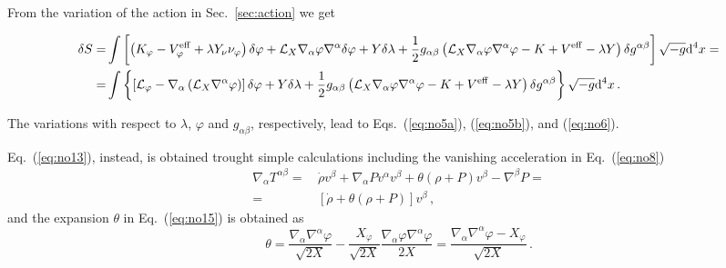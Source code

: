 \documentclass[twocolumn,showpacs, nofootinbib,aps,superscriptaddress, eqsecnum,prd,prl,notitlepage,showkeys,10pt,reprint]{revtex4-1}
\begin{document}
From the variation of the action in Sec.~\ref{sec:action} we get
%
\begin{widetext}
\begin{align}
\nonumber
\delta S = &\int \left[ \left(K_\varphi - V^{\rm eff}_\varphi + \lambda Y_\nu\nu_\varphi \right) \delta\varphi + \mathcal{L}_X \nabla_\alpha\varphi \nabla^\alpha \delta \varphi + Y \delta\lambda + \frac{1}{2} g_{\alpha\beta} \left(\mathcal{L}_X \nabla_\alpha\varphi \nabla^\alpha \varphi - K + V^{\rm eff} - \lambda Y \right) \delta g^{\alpha\beta}\right] \sqrt{-g}{\rm d}^4x =\\
\label{eq:ap1}
= & \int \left\{ \left[ \mathcal{L}_\varphi - \nabla_\alpha \left(\mathcal{L}_X \nabla^\alpha \varphi \right) \right] \delta\varphi + Y \delta\lambda + \frac{1}{2} g_{\alpha\beta} \left( \mathcal{L}_X \nabla_\alpha\varphi \nabla^\alpha \varphi - K + V^{\rm eff} - \lambda Y \right) \delta g^{\alpha\beta} \right\} \sqrt{-g}{\rm d}^4x\,.
\end{align}
\end{widetext}
%
The variations with respect to $\lambda$, $\varphi$ and $g_{\alpha\beta}$, respectively, lead to Eqs.~(\ref{eq:no5a}), (\ref{eq:no5b}), and (\ref{eq:no6}).

Eq.~(\ref{eq:no13}), instead, is obtained trought simple calculations including the vanishing acceleration in Eq.~(\ref{eq:no8})
%
\begin{align}
\nonumber
\nabla_\alpha T^{\alpha\beta} =\,& \dot{\rho} v^\beta + \nabla_\alpha P v^\alpha v^\beta + \theta \left( \rho + P \right) v^\beta - \nabla^\beta P =\\
\label{eq:ap2}
=\,& \left[ \dot{\rho} + \theta \left( \rho + P \right) \right] v^\beta\,,
\end{align}
%
and the expansion $\theta$ in Eq.~(\ref{eq:no15}) is obtained as
%
\begin{equation}
\label{eq:ap3}
\theta = \frac{\nabla_\alpha \nabla^\alpha \varphi}{\sqrt{2X}} - \frac{X_\varphi}{\sqrt{2X}}\frac{\nabla_\alpha \varphi \nabla^\alpha \varphi}{2X} = \frac{\nabla_\alpha \nabla^\alpha \varphi - X_\varphi}{\sqrt{2X}}\,.
\end{equation}
\end{document}
